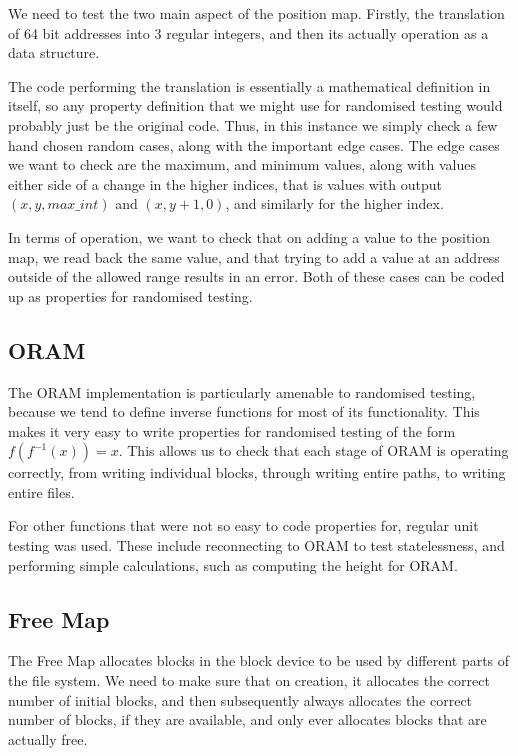\documentclass[12pt,a4paper,twoside,openright]{report}
\begin{document}
We need to test the two main aspect of the position map. Firstly, the translation of 64 bit addresses into 3 regular integers, and then its actually operation as a data structure.

The code performing the translation is essentially a mathematical definition in itself, so any property definition that we might use for randomised testing would probably just be the original code. Thus, in this instance we simply check a few hand chosen random cases, along with the important edge cases. The edge cases we want to check are the maximum, and minimum values, along with values either side of a change in the higher indices, that is values with output $(x,y,max\_int)$ and $(x,y+1,0)$, and similarly for the higher index.

In terms of operation, we want to check that on adding a value to the position map, we read back the same value, and that trying to add a value at an address outside of the allowed range results in an error. Both of these cases can be coded up as properties for randomised testing.

\subsection{ORAM}

The ORAM implementation is particularly amenable to randomised testing, because we tend to define inverse functions for most of its functionality. This makes it very easy to write properties for randomised testing of the form $f(f^{-1}(x)) = x$. This allows us to check that each stage of ORAM is operating correctly, from writing individual blocks, through writing entire paths, to writing entire files.

For other functions that were not so easy to code properties for, regular unit testing was used. These include reconnecting to ORAM to test statelessness, and performing simple calculations, such as computing the height for ORAM.

\subsection{Free Map}

The Free Map allocates blocks in the block device to be used by different parts of the file system. We need to make sure that on creation, it allocates the correct number of initial blocks, and then subsequently always allocates the correct number of blocks, if they are available, and only ever allocates blocks that are actually free.
\end{document}

